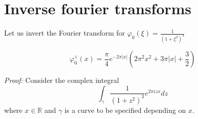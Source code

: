 \documentclass[11pt,a4paper]{article}
\begin{document}
\newpage
\printbibliography[heading=bibintoc]
\newpage
\appendix

\section{Inverse fourier transforms}\label{sec:inverse-ft-calculations}
Let us invert the Fourier transform for $\varphi_0(\xi) = \frac{1}{(1+\xi^2)^3}$ 

\begin{lemma}
    \begin{equation*}
    \varphi_0^\vee (x) = \frac{\pi}{4}e^{-2\pi \lvert x\rvert}\left(2\pi^2x^2+3\pi \lvert x\rvert +\frac{3}{2}\right)
\end{equation*}
\end{lemma}

\textit{Proof:} Consider the complex integral 
\begin{equation*}
    \int_\gamma \frac{1}{(1+z^2)^3} e^{2\pi i z x} dz
\end{equation*}
where $x\in \mathbb{R}$ and $\gamma$ is a curve to be specified depending on $x$.
\end{document}
